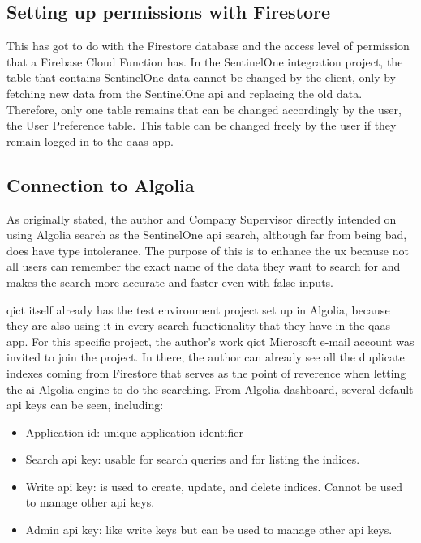 \begin{multicols}{2}
      \subsection{Setting up permissions with Firestore}

      This has got to do with the Firestore database and the access level of permission that a Firebase Cloud Function has. In the
      SentinelOne integration project, the table that contains SentinelOne data cannot be changed by the client, only by fetching new
      data from the SentinelOne \acrshort{api} and replacing the old data. Therefore, only one table remains that can be
      changed accordingly by the user, the User Preference table. This table can be changed freely by the user if they remain
      logged in to the \acrshort{qaas} app.


      \subsection{Connection to Algolia}

      As originally stated, the author and Company Supervisor directly intended on using Algolia search as the SentinelOne
      \acrshort{api} search, although far from being bad, does have type intolerance. The purpose of this is to enhance the \acrshort{ux}
      because not all users can remember the exact name of the data they want to search for and makes the search more accurate and faster
      even with false inputs.

      \acrshort{qict} itself already has the test environment project set up in Algolia, because they are also using it in every search functionality
      that they have in the \acrshort{qaas} app. For this specific project, the author's work \acrshort{qict} Microsoft e-mail account was invited to join
      the project. In there, the author can already see all the duplicate indexes coming from Firestore that serves as the point of reverence when letting
      the \acrshort{ai} Algolia engine to do the searching. From Algolia dashboard, several default \acrshort{api} keys can be seen, including:
      \begin{itemize}
            \item Application \acrshort{id}: unique application identifier
            \item Search \acrshort{api} key: usable for search queries and for listing the indices.
            \item Write \acrshort{api} key: is used to create, update, and delete indices. Cannot be used to manage other \acrshort{api} keys.
            \item Admin \acrshort{api} key: like write keys but can be used to manage other \acrshort{api} keys.
      \end{itemize}


\end{multicols}
